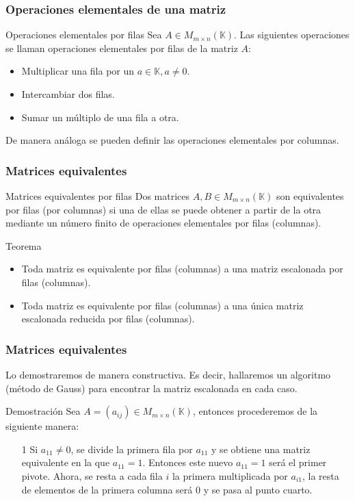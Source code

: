 \documentclass[aspectratio=169]{beamer}
\begin{document}
 \begin{frame}
  \frametitle{Operaciones elementales de una matriz}

 \begin{block}{Operaciones elementales por filas}
Sea $A\in M_{m\times n}(\mathbb{K})$. Las siguientes operaciones se llaman operaciones elementales por filas de la matriz $A$:
\begin{itemize}
\item Multiplicar una fila por un $a\in\mathbb{K}, a\neq 0$.
\item Intercambiar dos filas.
\item Sumar un m\'ultiplo de una fila a otra.

\end{itemize}
\end{block}

De manera an\'aloga se pueden definir las operaciones elementales por columnas.
\end{frame} 
  
  
   \begin{frame}
  \frametitle{Matrices equivalentes}

 \begin{block}{Matrices equivalentes por filas}
Dos matrices $A,B\in M_{m\times n}(\mathbb{K})$ son equivalentes por filas (por columnas) si una de ellas se puede obtener a partir de la otra mediante un n\'umero finito de operaciones elementales por filas (columnas).
\end{block}


 \begin{block}{Teorema}
 \begin{itemize}
\item Toda matriz es equivalente por filas (columnas) a una matriz escalonada por filas (columnas).
\item Toda matriz es equivalente por filas (columnas) a una \'unica matriz escalonada reducida por filas (columnas).
\end{itemize}
\end{block}

\end{frame} 

 \begin{frame}
  \frametitle{Matrices equivalentes}
Lo demostraremos de manera constructiva. Es decir, hallaremos un algoritmo (m\'etodo de Gauss) para encontrar la matriz escalonada en cada caso.
 \begin{block}{Demostraci\'on}
 Sea $A = (a_{ij}) \in M_{m\times n}(\mathbb{K})$, entonces procederemos de la siguiente manera:
\begin{itemize}
\item[1] Si $a_{11}\neq 0$, se divide la primera fila por $a_{11}$ y se obtiene una matriz equivalente en la que $a_{11} = 1$. Entonces este nuevo $a_{11} = 1$ ser\'a el primer pivote. Ahora, se resta a cada fila $i$ la primera multiplicada por $a_{i1}$, la resta de elementos de la primera columna ser\'a 0 y se pasa al punto cuarto.
\end{itemize}
\end{block}
\end{frame} 
\end{document}
